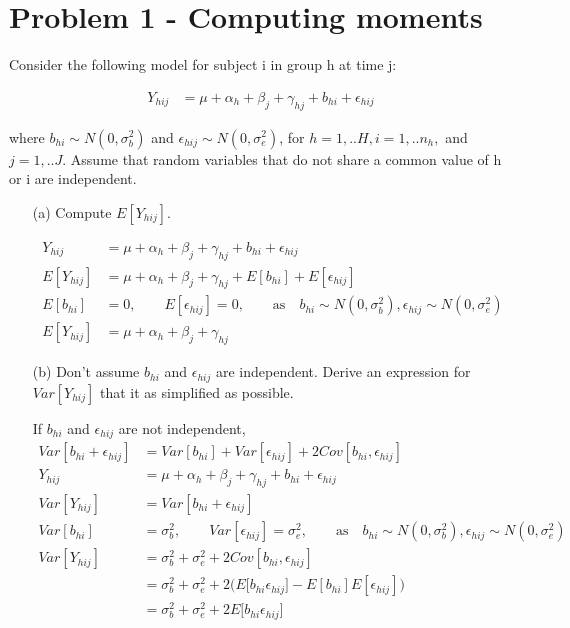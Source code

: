 

\section{Problem 1 - Computing moments}
Consider the following model for subject i in group h at time j:
 
\begin{align*}
	Y_{hij} &= \mu + \alpha_h + \beta_j + \gamma_{hj} + b_{hi} + \epsilon_{hij}
\end{align*}

where $b_{hi} \sim N(0, \sigma^2_b)$ and $\epsilon_{hij} \sim N(0, \sigma^2_e)$, for $h=1,..H, i=1,..n_h,$ and $j=1,.. J$. Assume that random variables that do not share a common value of h or i are independent. 

\begin{itemize}
\item[(a)] Compute $E[Y_{hij}]$.
	
	\begin{align*}
		Y_{hij} &= \mu + \alpha_h + \beta_j + \gamma_{hj} + b_{hi} + \epsilon_{hij} \\
		E[Y_{hij}] &= \mu + \alpha_h + \beta_j + \gamma_{hj} + E[b_{hi}] + E[\epsilon_{hij}] \\
		 E[b_{hi}] &= 0, \qquad E[\epsilon_{hij}] = 0, \qquad \text{as} \quad b_{hi} \sim N(0, \sigma^2_b), \epsilon_{hij} \sim N(0, \sigma^2_e) \\
		E[Y_{hij}] &= \mu + \alpha_h + \beta_j + \gamma_{hj} 
	\end{align*}

\item[(b)] Don't assume $b_{hi}$ and $\epsilon_{hij}$ are independent. Derive an expression for $Var[Y_{hij}]$ that it as simplified as possible.

If $b_{hi}$ and $\epsilon_{hij}$ are not independent,
\begin{align*}
	Var[b_{hi} + \epsilon_{hij}] &= Var[b_{hi}] + Var[\epsilon_{hij}] +2 Cov[b_{hi}, \epsilon_{hij}] \\
	Y_{hij} &= \mu + \alpha_h + \beta_j + \gamma_{hj} + b_{hi} + \epsilon_{hij} \\
	Var[Y_{hij}] &= Var[b_{hi} + \epsilon_{hij}] \\
	Var[b_{hi}] &= \sigma^2_b, \qquad Var[\epsilon_{hij}] = \sigma^2_e, \qquad \text{as} \quad b_{hi} \sim N(0, \sigma^2_b), \epsilon_{hij} \sim N(0, \sigma^2_e) \\
	Var[Y_{hij}] &= \sigma^2_b + \sigma^2_e + 2 Cov[b_{hi}, \epsilon_{hij}] \\
	&=  \sigma^2_b + \sigma^2_e + 2 \Bigg( E \Big[ b_{hi} \epsilon_{hij} \Big] - E[b_{hi} ] E[\epsilon_{hij}] \Bigg) \\
	&= \sigma^2_b + \sigma^2_e + 2 E \Big[ b_{hi} \epsilon_{hij} \Big] 
\end{align*}


\end{itemize}
